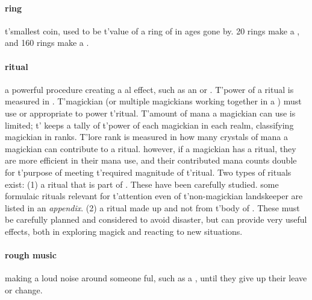 \paragraph{ring} t'\allowbreak smallest coin, used to be t'\allowbreak value of a ring of  in ages gone by. 20 rings make a , and 160 rings make a . 
\paragraph{ritual} a powerful procedure creating a al effect, such as an  or . T'power of a ritual is measured in . T'magickian (or multiple magickians working together in a ) must use  or appropriate  to power t'\allowbreak ritual. T'amount of mana a magickian can use is limited; t'\allowbreak {} keeps a tally of t'\allowbreak power of each magickian in each realm, classifying magickian in  ranks. T'lore rank is measured in how many crystals of mana a magickian can contribute to a ritual. however, if a magickian has  a ritual, they are more efficient in their mana use, and their contributed mana counts double for t'\allowbreak purpose of meeting t'\allowbreak required magnitude of t'\allowbreak ritual. Two types of rituals exist: (1)  a ritual that is part of . These have been carefully studied. some formulaic rituals relevant for t'\allowbreak attention even of t'\allowbreak non-magickian landskeeper are listed in an \emph{appendix}. (2)  a ritual made up and not from t'\allowbreak body of . These must be carefully planned and considered to avoid disaster, but can provide very useful effects, both in exploring magick and reacting to new situations.
\paragraph{rough music} making a loud noise around someone ful, such as a , until they give up their leave or change. 
